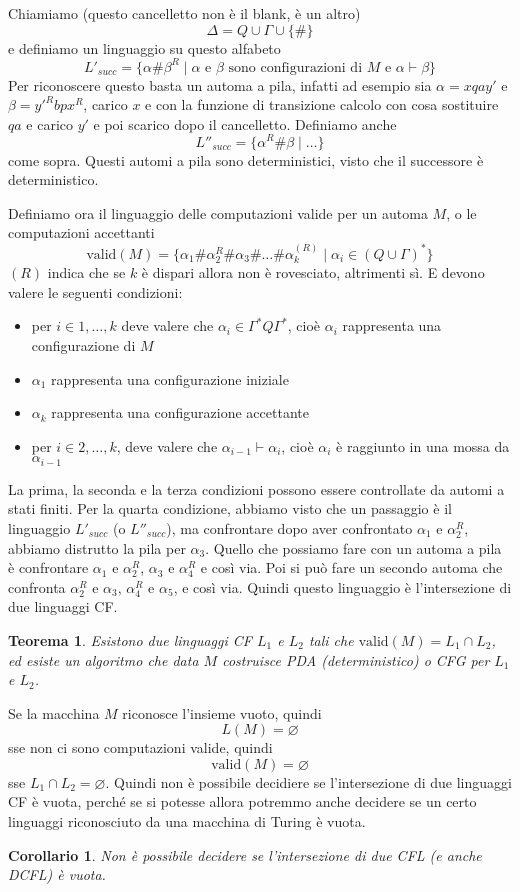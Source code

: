 \documentclass[12pt]{report}
\newtheorem{teorema}{Teorema}
\newtheorem{corollario}{Corollario}
\theoremstyle{definition}
\begin{document}
Chiamiamo (questo cancelletto non è il blank, è un altro)
$$ \Delta = Q \cup \Gamma \cup \{\# \} $$
e definiamo un linguaggio su questo alfabeto
$$ L'_{succ} = \{ \alpha \# \beta^{R} \mid \text{$\alpha$ e $\beta$ sono configurazioni di $M$ e $\alpha \vdash \beta$} \} $$
Per riconoscere questo basta un automa a pila, infatti ad esempio sia $\alpha = xqay'$ e $\beta = y'^Rbpx^R$, carico $x$ e con la funzione di transizione calcolo con cosa sostituire $qa$ e carico $y'$ e poi scarico dopo il cancelletto.
Definiamo anche
$$ L''_{succ} = \{ \alpha^R \# \beta \mid \dots \} $$
come sopra.
Questi automi a pila sono deterministici, visto che il successore è deterministico.

Definiamo ora il linguaggio delle computazioni valide per un automa $M$, o le computazioni accettanti
$$ \text{valid}(M) = \{ \alpha_1 \# \alpha_2^R \# \alpha_3 \# \dots \# \alpha_k^{(R)} \mid \alpha_i \in (Q \cup \Gamma)^* \} $$
$(R)$ indica che se $k$ è dispari allora non è rovesciato, altrimenti sì.
E devono valere le seguenti condizioni:
\begin{itemize}
	\item per $i \in 1, \dots, k$ deve valere che $\alpha_i \in \Gamma^* Q \Gamma^*$, cioè $\alpha_i$ rappresenta una configurazione di $M$
	\item $\alpha_1$ rappresenta una configurazione iniziale
	\item $\alpha_k$ rappresenta una configurazione accettante
	\item per $i \in 2, \dots, k$, deve valere che $\alpha_{i - 1} \vdash \alpha_i$, cioè $\alpha_i$ è raggiunto in una mossa da $\alpha_{i - 1}$
\end{itemize}
La prima, la seconda e la terza condizioni possono essere controllate da automi a stati finiti.
Per la quarta condizione, abbiamo visto che un passaggio è il linguaggio $L'_{succ}$ (o $L''_{succ}$), ma confrontare dopo aver confrontato $\alpha_1$ e $\alpha_2^R$, abbiamo distrutto la pila per $\alpha_3$.
Quello che possiamo fare con un automa a pila è confrontare $\alpha_1$ e $\alpha_2^R$, $\alpha_3$ e $\alpha_4^R$ e così via.
Poi si può fare un secondo automa che confronta $\alpha_2^R$ e $\alpha_3$, $\alpha_4^R$ e $\alpha_5$, e così via.
Quindi questo linguaggio è l'intersezione di due linguaggi CF.

\begin{teorema}
	Esistono due linguaggi CF $L_1$ e $L_2$ tali che $\text{valid}(M) = L_1 \cap L_2$, ed esiste un algoritmo che data $M$ costruisce PDA (deterministico) o CFG per $L_1$ e $L_2$.
\end{teorema}
Se la macchina $M$ riconosce l'insieme vuoto, quindi
$$ L(M) = \varnothing $$
sse non ci sono computazioni valide, quindi
$$ \text{valid}(M) = \varnothing $$
sse $L_1 \cap L_2 = \varnothing$.
Quindi non è possibile decidiere se l'intersezione di due linguaggi CF è vuota, perché se si potesse allora potremmo anche decidere se un certo linguaggi riconosciuto da una macchina di Turing è vuota.
\begin{corollario}
	Non è possibile decidere se l'intersezione di due CFL (e anche DCFL) è vuota.
\end{corollario}
\end{document}

